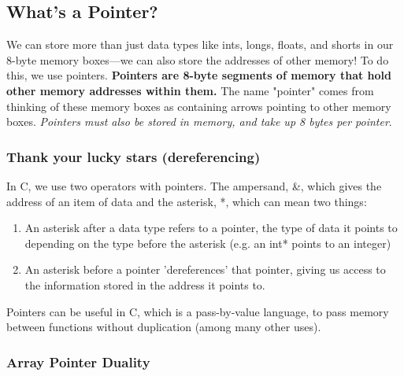 \documentclass[a4paper, 12pt]{article}
\begin{document}
\subsection{What's a Pointer?}

\begin{flushleft}
	We can store more than just data types like ints, longs, floats, and shorts in our 8-byte memory boxes---we can  also store the addresses
	of other memory! To do this, we use pointers.
	\newline
	\newline
	\textbf{Pointers are 8-byte segments of memory that hold other memory addresses within them.} The name "pointer" comes from thinking of these
	memory boxes as containing arrows pointing to other memory boxes. \textit{Pointers must also be stored in memory, and take up 8 bytes per pointer}.
\end{flushleft}

\subsubsection{Thank your lucky stars (dereferencing)}

\begin{flushleft}

	In C, we use two operators with pointers. The ampersand, \&, which gives the address of an item of data and the asterisk, *, which can mean two things:
	\begin{enumerate}
		\item An asterisk after a data type refers to a pointer, the type of data it points to depending on the type before the asterisk (e.g. an int* points to an integer)
		\item An asterisk before a pointer 'dereferences' that pointer, giving us access to the information stored in the address it points to.
	\end{enumerate}

	Pointers can be useful in C, which is a pass-by-value language, to pass memory between functions without duplication (among many other uses).
\end{flushleft}

\subsubsection{Array Pointer Duality}
\end{document}
